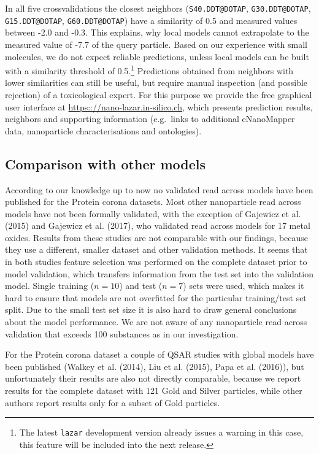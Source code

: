 \documentclass[utf8]{frontiersHLTH} %
\begin{document}
In all five crossvalidations the closest neighbors
(\texttt{S40.DDT@DOTAP}, \texttt{G30.DDT@DOTAP}, \texttt{G15.DDT@DOTAP},
\texttt{G60.DDT@DOTAP}) have a similarity of 0.5 and measured values
between -2.0 and -0.3. This explains, why local models cannot
extrapolate to the measured value of -7.7 of the query particle. Based
on our experience with small molecules, we do not expect reliable
predictions, unless local models can be built with a similarity
threshold of 0.5.\footnote{The latest \texttt{lazar} development version
  already issues a warning in this case, this feature will be included
  into the next release.} Predictions obtained from neighbors with lower
similarities can still be useful, but require manual inspection (and
possible rejection) of a toxicological expert. For this purpose we
provide the free graphical user interface at
\url{https:://nano-lazar.in-silico.ch}, which presents prediction
results, neighbors and supporting information (e.g.~links to additional
eNanoMapper data, nanoparticle characterisations and ontologies).

\subsection{Comparison with other
models}\label{comparison-with-other-models}

According to our knowledge up to now no validated read across models
have been published for the Protein corona datasets. Most other
nanoparticle read across models have not been formally validated, with
the exception of Gajewicz et al. (2015) and Gajewicz et al. (2017), who
validated read across models for 17 metal oxides. Results from these
studies are not comparable with our findings, because they use a
different, smaller dataset and other validation methods. It seems that
in both studies feature selection was performed on the complete dataset
prior to model validation, which transfers information from the test set
into the validation model. Single training (\(n=10\)) and test (\(n=7\))
sets were used, which makes it hard to ensure that models are not
overfitted for the particular training/test set split. Due to the small
test set size it is also hard to draw general conclusions about the
model performance. We are not aware of any nanoparticle read across
validation that exceeds 100 substances as in our investigation.

For the Protein corona dataset a couple of QSAR studies with global
models have been published (Walkey et al. (2014), Liu et al. (2015),
Papa et al. (2016)), but unfortunately their results are also not
directly comparable, because we report results for the complete dataset
with 121 Gold and Silver particles, while other authors report results
only for a subset of Gold particles.
\end{document}
